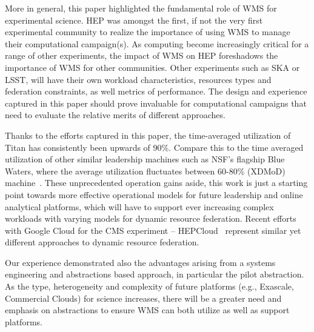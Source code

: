 More in general, this paper highlighted the fundamental role of WMS for
experimental science. HEP was amongst the first, if not the very first
experimental community to realize the importance of using WMS to manage their
computational campaign(s). As computing become increasingly critical for a range
of other experiments, the impact of WMS on HEP foreshadows the importance of WMS
for other communities.
Other experiments such as SKA or LSST, will have their own workload
characteristics, resources types and federation constraints, as well metrics of
performance. The design and experience captured in this paper should prove
invaluable for computational campaigns that need to evaluate the relative merits
of different approaches.

Thanks to the efforts captured in this paper, the time-averaged utilization of
Titan has consistently been upwards of 90\%. Compare this to the time averaged
utilization of other similar leadership machines such as NSF's flagship Blue
Waters, where the average utilization fluctuates between 60-80\% (XDMoD)
machine~\cite{bw-sucks}. These %
unprecedented operation gains aside, this work is just a starting point towards
more effective operational models for future leadership and online analytical
platforms\cite{foap-url}, which will have to support ever increasing complex
workloads with varying models for dynamic resource federation. Recent efforts
with Google Cloud for the CMS experiment -- HEPCloud~\cite{hepcloud,google-hep}
represent similar yet different approaches to dynamic resource federation.

Our experience demonstrated also the advantages arising from a systems
engineering and abstractions based approach, in particular the pilot
abstraction. As the type, heterogeneity and complexity of future platforms
(e.g., Exascale, Commercial Clouds) for science increases, there will be a
greater need and emphasis on abstractions to ensure WMS can both utilize as well
as support platforms.
